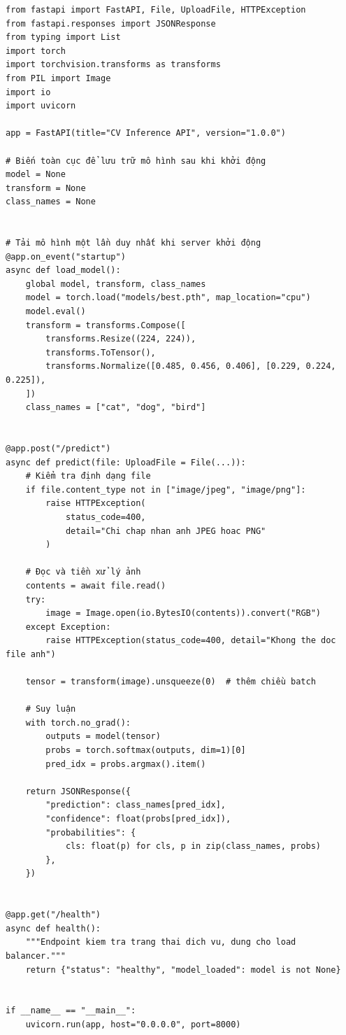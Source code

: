 \begin{verbatim}
from fastapi import FastAPI, File, UploadFile, HTTPException
from fastapi.responses import JSONResponse
from typing import List
import torch
import torchvision.transforms as transforms
from PIL import Image
import io
import uvicorn

app = FastAPI(title="CV Inference API", version="1.0.0")

# Biến toàn cục để lưu trữ mô hình sau khi khởi động
model = None
transform = None
class_names = None


# Tải mô hình một lần duy nhất khi server khởi động
@app.on_event("startup")
async def load_model():
    global model, transform, class_names
    model = torch.load("models/best.pth", map_location="cpu")
    model.eval()
    transform = transforms.Compose([
        transforms.Resize((224, 224)),
        transforms.ToTensor(),
        transforms.Normalize([0.485, 0.456, 0.406], [0.229, 0.224, 0.225]),
    ])
    class_names = ["cat", "dog", "bird"]


@app.post("/predict")
async def predict(file: UploadFile = File(...)):
    # Kiểm tra định dạng file
    if file.content_type not in ["image/jpeg", "image/png"]:
        raise HTTPException(
            status_code=400,
            detail="Chi chap nhan anh JPEG hoac PNG"
        )

    # Đọc và tiền xử lý ảnh
    contents = await file.read()
    try:
        image = Image.open(io.BytesIO(contents)).convert("RGB")
    except Exception:
        raise HTTPException(status_code=400, detail="Khong the doc file anh")

    tensor = transform(image).unsqueeze(0)  # thêm chiều batch

    # Suy luận
    with torch.no_grad():
        outputs = model(tensor)
        probs = torch.softmax(outputs, dim=1)[0]
        pred_idx = probs.argmax().item()

    return JSONResponse({
        "prediction": class_names[pred_idx],
        "confidence": float(probs[pred_idx]),
        "probabilities": {
            cls: float(p) for cls, p in zip(class_names, probs)
        },
    })


@app.get("/health")
async def health():
    """Endpoint kiem tra trang thai dich vu, dung cho load balancer."""
    return {"status": "healthy", "model_loaded": model is not None}


if __name__ == "__main__":
    uvicorn.run(app, host="0.0.0.0", port=8000)
\end{verbatim}

